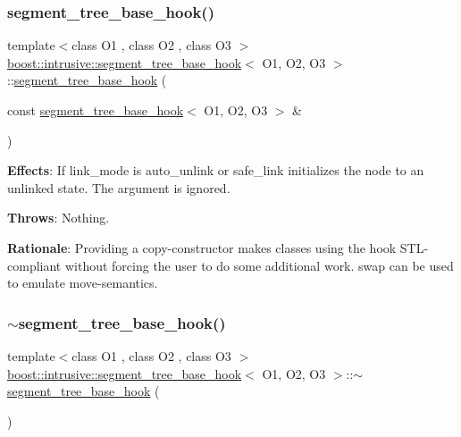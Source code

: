\subsubsection{\texorpdfstring{segment\+\_\+tree\+\_\+base\+\_\+hook()}{segment\_tree\_base\_hook()}\hspace{0.1cm}{\footnotesize\ttfamily [2/2]}}
{\footnotesize\ttfamily template$<$class O1 , class O2 , class O3 $>$ \\
\hyperlink{classboost_1_1intrusive_1_1segment__tree__base__hook}{boost\+::intrusive\+::segment\+\_\+tree\+\_\+base\+\_\+hook}$<$ O1, O2, O3 $>$\+::\hyperlink{classboost_1_1intrusive_1_1segment__tree__base__hook}{segment\+\_\+tree\+\_\+base\+\_\+hook} (\begin{DoxyParamCaption}\item[{const \hyperlink{classboost_1_1intrusive_1_1segment__tree__base__hook}{segment\+\_\+tree\+\_\+base\+\_\+hook}$<$ O1, O2, O3 $>$ \&}]{ }\end{DoxyParamCaption})}

{\bfseries Effects}\+: If link\+\_\+mode is {\ttfamily auto\+\_\+unlink} or {\ttfamily safe\+\_\+link} initializes the node to an unlinked state. The argument is ignored.

{\bfseries Throws}\+: Nothing.

{\bfseries Rationale}\+: Providing a copy-\/constructor makes classes using the hook S\+T\+L-\/compliant without forcing the user to do some additional work. {\ttfamily swap} can be used to emulate move-\/semantics. \mbox{\label{classboost_1_1intrusive_1_1segment__tree__base__hook_a85af62343b5a68ef5fd830dd48e4c1d1}} 
\subsubsection{\texorpdfstring{$\sim$segment\+\_\+tree\+\_\+base\+\_\+hook()}{~segment\_tree\_base\_hook()}}
{\footnotesize\ttfamily template$<$class O1 , class O2 , class O3 $>$ \\
\hyperlink{classboost_1_1intrusive_1_1segment__tree__base__hook}{boost\+::intrusive\+::segment\+\_\+tree\+\_\+base\+\_\+hook}$<$ O1, O2, O3 $>$\+::$\sim$\hyperlink{classboost_1_1intrusive_1_1segment__tree__base__hook}{segment\+\_\+tree\+\_\+base\+\_\+hook} (\begin{DoxyParamCaption}{ }\end{DoxyParamCaption})}


